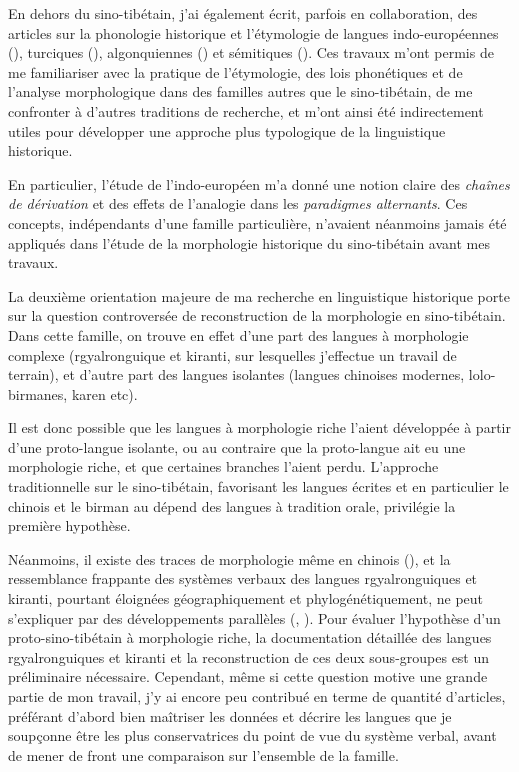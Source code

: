 \documentclass[oldfontcommands,oneside,a4paper,11pt]{article}
\begin{document}
En dehors du sino-tibétain, j'ai également écrit, parfois en collaboration, des articles sur la phonologie historique et l'étymologie de langues indo-européennes (\citealt{jacques13vama}),   turciques (\citealt{antonov12kumush}), algonquiennes (\citealt{jacques13arapaho}) et sémitiques (\citealt{rg-gj12yod}). Ces travaux m'ont permis de me familiariser avec la pratique de l'étymologie, des lois phonétiques et de l'analyse morphologique dans des familles autres que le sino-tibétain, de me confronter à d'autres traditions de recherche, et m'ont ainsi été indirectement utiles pour développer une approche plus typologique de la linguistique historique.  

En particulier, l'étude de l'indo-européen m'a donné une notion claire des \textit{chaînes de dérivation} et des effets de l'analogie dans les \textit{paradigmes alternants}. Ces concepts, indépendants d'une famille particulière, n'avaient néanmoins jamais été appliqués dans l'étude de la morphologie historique du sino-tibétain avant mes travaux.

 La deuxième orientation majeure de ma recherche en linguistique historique porte sur la question controversée de reconstruction de la morphologie en sino-tibétain. Dans cette famille, on trouve en effet d'une part des langues à morphologie complexe (rgyalronguique et kiranti, sur lesquelles j'effectue un travail de terrain), et d'autre part des langues isolantes (langues chinoises modernes, lolo-birmanes, karen etc). 
 
Il est donc possible que les langues à morphologie riche l'aient développée à partir d'une proto-langue isolante, ou au contraire que la proto-langue ait eu une morphologie riche, et que certaines branches l'aient perdu. L'approche traditionnelle sur le sino-tibétain, favorisant les langues écrites et en particulier le chinois et le birman au dépend des langues à tradition orale, privilégie la première hypothèse. 

Néanmoins, il existe des traces de morphologie même en chinois (\citealt{sagart99roc}), et la ressemblance frappante des systèmes verbaux des langues rgyalronguiques et kiranti, pourtant éloignées géographiquement et phylogénétiquement, ne peut s'expliquer par des développements parallèles (\citealt{jacques10zos}, \citealt{jacques12agreement}). Pour évaluer l'hypothèse d'un proto-sino-tibétain à morphologie riche, la documentation détaillée des langues rgyalronguiques et kiranti et la reconstruction de ces deux sous-groupes est un préliminaire nécessaire. Cependant, même si cette question motive une grande partie de mon travail, j'y ai encore peu contribué en terme de quantité d'articles, préférant d'abord bien maîtriser les données et décrire les langues que je soupçonne être les plus conservatrices du point de vue du système verbal, avant de mener de front une comparaison sur l'ensemble de la famille.
   
\end{document}
